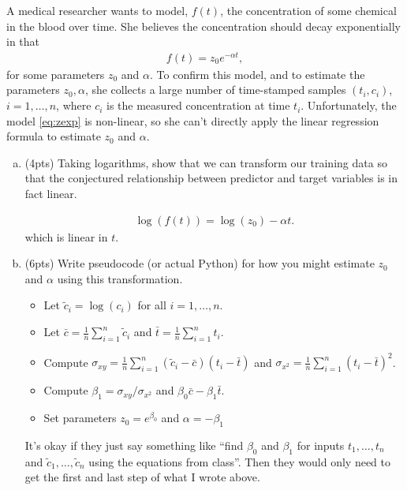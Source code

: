 \documentclass[10pt]{article}
\begin{document}
 A medical researcher wants to model, $f(t)$, the concentration
of some chemical in the blood
over time. She believes the concentration should decay exponentially in that
\begin{align}
\label{eq:zexp}
f(t) = z_0 e^{-\alpha t},
\end{align}
for some parameters $z_0$ and $\alpha$.
To confirm this model, and to estimate the parameters $z_0,\alpha$,
she collects a large number of time-stamped samples $(t_i,c_i)$, $i=1,\ldots,n$, where $c_i$ is the measured concentration at time $t_i$.
Unfortunately, the model \eqref{eq:zexp} is non-linear, so she can't directly apply
the linear regression formula to estimate $z_0$ and $\alpha$.
\begin{enumerate}[(a)]
	\item  (4pts) Taking logarithms, show that we can transform our training data so that the conjectured relationship between predictor and target variables is in fact linear. 
	
	\begin{align*}
		 \log(f(t)) = \log(z_0) - \alpha t.
	\end{align*}
	which is linear in $t$.
	
	\item  (6pts) Write pseudocode (or actual Python) for how you might estimate $z_0$ and $\alpha$ using this transformation. 
	\begin{itemize}
		\item Let $\tilde{c}_i = \log(c_i)$  for all  $i=1,\ldots,n$.
		\item Let $\bar{c} = \frac{1}{n}\sum_{i=1}^n \tilde{c}_i$ and $\bar{t} = \frac{1}{n}\sum_{i=1}^n {t}_i$.
		\item Compute $\sigma_{xy} = \frac{1}{n}\sum_{i=1}^n (\tilde{c}_i - \bar{c})(t_i - \bar{t})$ and $\sigma_{x^2} = \frac{1}{n}\sum_{i=1}^n (t_i - \bar{t})^2$.
		\item Compute $\beta_1 = \sigma_{xy} /\sigma_{x^2}$ and  $\beta_0 \bar{c} - \beta_1 \bar{t}$.
		\item Set parameters $z_0 = e^{\beta_0}$ and $\alpha =  -\beta_1$
	\end{itemize}
It's okay if they just say something like ``find $\beta_0$ and $\beta_1$ for inputs $t_1, \ldots, t_n$ and $\tilde{c}_1, \ldots, \tilde{c}_n$ using the equations from class''. Then they would only need to get the first and last step of what I wrote above. 
\end{enumerate}
\end{document}
